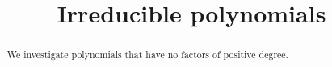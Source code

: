 \documentclass{ximera}
\title{Irreducible polynomials}
\begin{document}
\begin{abstract}
  We investigate polynomials that have no factors of positive degree.
\end{abstract}
\maketitle
\end{document}
